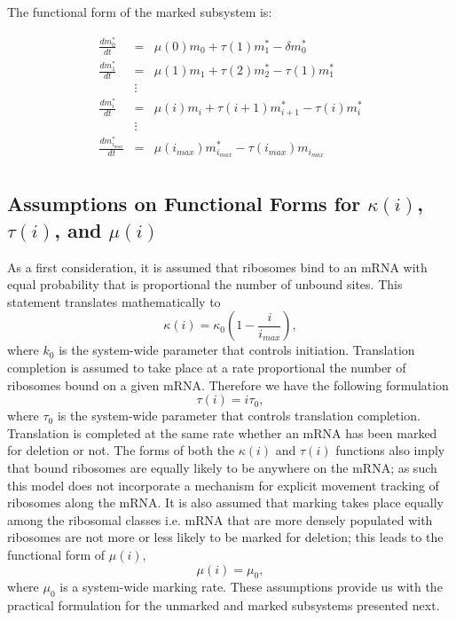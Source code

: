 \documentclass[review]{elsarticle}
\begin{document}
The functional form of the marked subsystem is:

\begin{eqnarray*}
\frac{dm_{0}^{*}}{dt} & = & \mu(0)m_{0}+\tau(1)m_{1}^{*}-\delta m_{0}^{*} \\
\frac{dm_{1}^{*}}{dt} & = & \mu(1)m_{1}+\tau(2)m_{2}^{*}-\tau(1)m_{1}^{*} \\
& \vdots & \\
\frac{dm_{i}^{*}}{dt} & = & \mu(i)m_{i}+\tau(i+1)m_{i+1}^{*}-\tau(i)m_{i}^{*} \\
& \vdots & \\
\frac{dm_{i_{max}}^{*}}{dt} & = & \mu(i_{max})m_{i_{max}}^{*}-\tau(i_{max})m_{i_{max}} \\
\end{eqnarray*}

\subsection{Assumptions on Functional Forms for $\kappa(i)$, $\tau(i)$, and $\mu(i)$}\label{sec:assumed_forms}

As a first consideration, it is assumed that ribosomes bind to an mRNA with equal probability that is proportional the number of unbound sites.
This statement translates mathematically to \begin{equation}\label{eq:kappa}\kappa(i)=\kappa_0\left(1-\frac{i}{i_{max}}\right),\end{equation} where $k_0$ is the system-wide parameter that controls initiation.
Translation completion is assumed to take place at a rate proportional the number of ribosomes bound on a given mRNA.
Therefore we have the following formulation \begin{equation}\label{eq:tau}\tau(i)=i\tau_0,\end{equation} where $\tau_0$ is the system-wide parameter that controls translation completion.
Translation is completed at the same rate whether an mRNA has been marked for deletion or not.
The forms of both the $\kappa(i)$ and $\tau(i)$ functions also imply that bound ribosomes are equally likely to be anywhere on the mRNA; as such this model does not incorporate a mechanism for explicit movement tracking of ribosomes along the mRNA.
It is also assumed that marking takes place equally among the ribosomal classes i.e. mRNA that are more densely populated with ribosomes are not more or less likely to be marked for deletion; this leads to the functional form of $\mu(i)$, $$\mu(i)=\mu_0,$$ where $\mu_0$ is a system-wide marking rate.
These assumptions provide us with the practical formulation for the unmarked and marked subsystems presented next.
\end{document}
